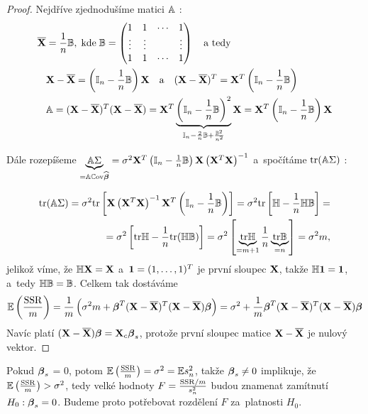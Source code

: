 \begin{proof}
Nejdříve zjednodušíme matici $\mathbb{A}$ :
\begin{align*}
	\overline{\mathbf{X}} & = \frac{1}{n} \mathbb{B}, \; \text{kde} \; \mathbb{B} = \begin{pmatrix}
	1 & 1 & \cdots & 1 \\
	\vdots & \vdots & & \vdots \\
	1 & 1 & \cdots & 1
	\end{pmatrix} \quad \text{a tedy} \\
	& \mathbf{X} - \overline{\mathbf{X}} = \left(\mathbb{I}_{n} - \frac{1}{n} \mathbb{B} \right) \mathbf{X} \quad \text{a} \quad (\mathbf{X} - \overline{\mathbf{X}})^T = \mathbf{X}^T \left(\mathbb{I}_{n} - \frac{1}{n} \mathbb{B} \right) \\
	& \mathbb{A} = (\mathbf{X} - \overline{\mathbf{X}})^T(\mathbf{X} - \overline{\mathbf{X}}) = \mathbf{X}^T \underbrace{\left(\mathbb{I}_{n} - \frac{1}{n} \mathbb{B} \right)^2}_{\mathbb{I}_{n} - \frac{2}{n} \mathbb{B} + \frac{\mathbb{B}^2}{n^2}} \mathbf{X} = \mathbf{X}^T \left(\mathbb{I}_{n} - \frac{1}{n} \mathbb{B} \right) \mathbf{X}
\end{align*}

Dále rozepíšeme $\underbrace{\mathbb{A} \Sigma}_{ = \mathbb{A} \mathbb{C}\mathrm{ov} \widehat{\boldsymbol{\beta}}} = \sigma^2 \mathbf{X}^T \left(\mathbb{I}_{n} - \frac{1}{n} \mathbb{B} \right) \mathbf{X} \left(\mathbf{X}^T \mathbf{X} \right)^{-1}$ a~spočítáme $\text{tr} (\mathbb{A} \Sigma)$ :

\begin{equation*}
\begin{split}
\text{tr} (\mathbb{A} \Sigma) = \sigma^2 \text{tr} \left[\mathbf{X} \left(\mathbf{X}^T \mathbf{X} \right)^{-1} \mathbf{X}^T \left(\mathbb{I}_{n} - \frac{1}{n} \mathbb{B} \right) \right] = \sigma^2 \text{tr}\left[\mathbb{H} - \frac{1}{n} \mathbb{H} \mathbb{B} \right] = \\ = \sigma^2 \left[\text{tr} \mathbb{H} - \frac{1}{n} \text{tr} (\mathbb{H} \mathbb{B}) \right] = \sigma^2 \left[\underbrace{\text{tr} \mathbb{H}}_{ = m+1} \frac{1}{n} \underbrace{\text{tr} \mathbb{B}}_{ = n} \right] = \sigma^2 m,
\end{split}
\end{equation*}
jelikož víme, že $\mathbb{H} \mathbf{X} = \mathbf{X}$ a~$\mathbf{1} = (1,\dots, 1)^T$ je první sloupec $\mathbf{X}$, takže $\mathbb{H} \mathbf{1} = \mathbf{1}$, a~tedy $\mathbb{H} \mathbb{B} = \mathbb{B}$. Celkem tak dostáváme
 $$
\mathbb{E} \left(\frac{\mathrm{SSR}}{m} \right) = \frac{1}{m} \left(\sigma^2 m + \boldsymbol{\beta}^T (\mathbf{X} - \overline{\mathbf{X}})^T(\mathbf{X} - \overline{\mathbf{X}}) \boldsymbol{\beta} \right) = \sigma^2 + \frac{1}{m} \boldsymbol{\beta}^T (\mathbf{X} - \overline{\mathbf{X}})^T(\mathbf{X} - \overline{\mathbf{X}}) \boldsymbol{\beta}
 $$
Navíc platí $(\mathbf{X} - \overline{\mathbf{X}}) \boldsymbol{\beta} = \mathbf{X}_c \boldsymbol{\beta}_s$, protože první sloupec matice $\mathbf{X} - \overline{\mathbf{X}}$ je nulový vektor.
\end{proof}

\begin{remark}
Pokud $\boldsymbol{\beta}_s$ = 0, potom $\mathbb{E} \left(\frac{\mathrm{SSR}}{m} \right) = \sigma^2 = \mathbb{E} s_n^2$, takže $\boldsymbol{\beta}_s \neq 0$ implikuje, že $\mathbb{E} \left(\frac{\mathrm{SSR}}{m} \right) > \sigma^2$, tedy velké hodnoty $F = \frac{\mathrm{SSR}/m}{s_n^2}$ budou znamenat zamítnutí $H_0: \boldsymbol{\beta}_s = 0$. Budeme proto potřebovat rozdělení $F$ za~platnosti $H_0$.
\end{remark}

